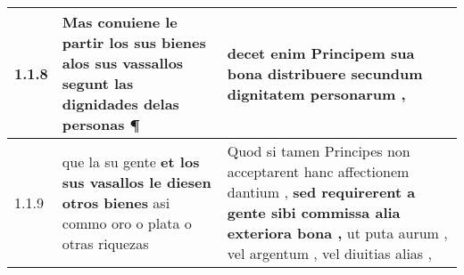 \begin{tabular}{|p{1cm}|p{6.5cm}|p{6.5cm}|}

\hline
1.1.8 & Mas conuiene le partir los sus bienes \textbf{ alos sus vassallos } segunt las dignidades delas personas ¶ & decet enim Principem \textbf{ sua bona distribuere } secundum dignitatem personarum , \\\hline
1.1.9 & que la su gente \textbf{ et los sus vasallos le diesen otros bienes } asi commo oro o plata o otras riquezas & Quod si tamen Principes non acceptarent hanc affectionem dantium , \textbf{ sed requirerent a gente sibi commissa alia exteriora bona , } ut puta aurum , vel argentum , vel diuitias alias , \\\hline

\end{tabular}
